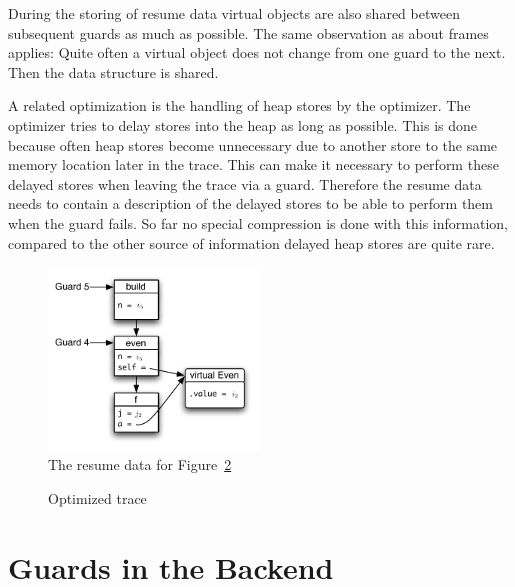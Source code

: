 \documentclass[10pt,preprint]{sigplanconf}
\begin{document}
During the storing of resume data virtual objects are also shared
between subsequent guards as much as possible.
The same observation as about frames applies:
Quite often a virtual object does not change from one guard to the next.
Then the data structure is shared.

A related optimization is the handling of heap stores by the optimizer.
The optimizer tries to delay stores into the heap as long as possible.
This is done because often heap stores become unnecessary
due to another store to the same memory location later in the trace.
This can make it necessary to perform these delayed stores
when leaving the trace via a guard.
Therefore the resume data needs to contain a description
of the delayed stores to be able to perform them when the guard fails.
So far no special compression is done with this information,
compared to the other source of information delayed heap stores are quite rare.

\begin{figure}
\includegraphics[width=0.5\textwidth]{figures/resume_data.pdf}
\caption{The resume data for Figure~\ref{fig:trace-log}}
\label{fig:resume-data}
\end{figure}


\begin{figure}
    
    \caption{Optimized trace}
    \label{fig:trace-log}
\end{figure}
\section{Guards in the Backend}
\label{sec:Guards in the Backend}
\end{document}
